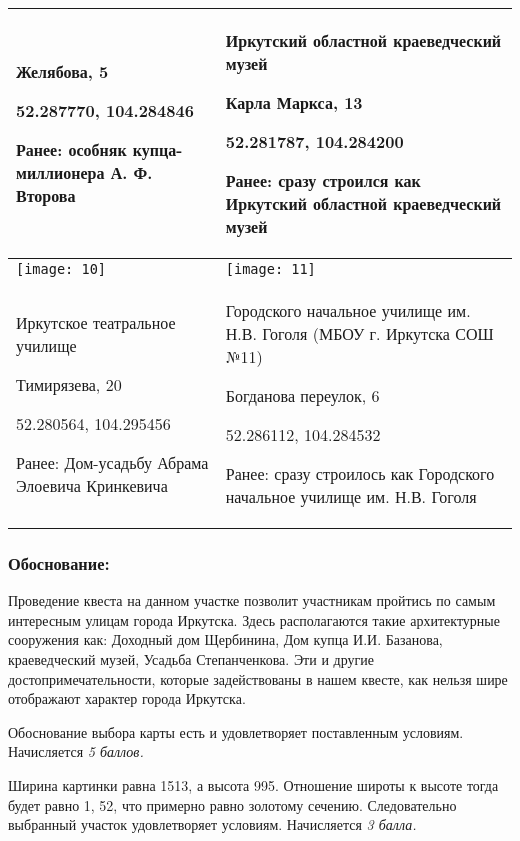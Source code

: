 \begin{tabular}{|p{8cm}|p{8cm}|}
    Желябова, 5 

    52.287770, 104.284846

    Ранее: особняк купца-миллионера А. Ф. Второва & Иркутский областной краеведческий музей 

    Карла Маркса, 13 
    
    52.281787, 104.284200 
    
    Ранее: сразу строился как Иркутский областной краеведческий музей \\
    \hline
    \texttt{[image: 10]} & \texttt{[image: 11]} \\
    \hline
    Иркутское театральное училище
    
    Тимирязева, 20
    
    52.280564, 104.295456 

    Ранее: Дом-усадьбу Абрама Элоевича Кринкевича & Городского начальное училище им. Н.В. Гоголя (МБОУ г. Иркутска СОШ №11)
    
    Богданова переулок, 6 

    52.286112, 104.284532
    
    Ранее: сразу строилось как Городского начальное училище им. Н.В. Гоголя \\
    \hline    
\end{tabular}

\subsubsection*{Обоснование:}

Проведение квеста на данном участке позволит участникам пройтись по самым интересным улицам города Иркутска. Здесь располагаются такие архитектурные сооружения как:  Доходный дом Щербинина, Дом купца И.И. Базанова, краеведческий музей, Усадьба Степанченкова. Эти и другие достопримечательности, которые задействованы в нашем квесте, как нельзя шире отображают характер города Иркутска. 


\markSection

Обоснование выбора карты есть и удовлетворяет поставленным условиям. Начисляется \textit{5 баллов.}

Ширина картинки равна 1513, а высота 995. Отношение широты к высоте тогда будет равно 1, 52, что примерно равно золотому сечению. Следовательно выбранный участок удовлетворяет условиям. Начисляется \textit{3 балла.}